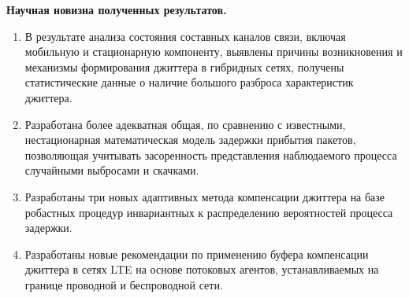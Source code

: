 \textbf{Научная новизна полученных результатов.} 
\begin{enumerate}
  \item В результате анализа состояния составных каналов связи, включая мобильную и стационарную компоненту, выявлены причины возникновения и механизмы формирования джиттера в гибридных сетях,
  получены статистические данные о наличие большого разброса характеристик джиттера.
  
 

  \item Разработана более адекватная общая, по сравнению с известными, нестационарная математическая модель задержки прибытия пакетов,
  позволяющая учитывать засоренность представления наблюдаемого процесса случайными выбросами и скачками.
  \item 
  Разработаны три новых адаптивных метода компенсации джиттера на базе робастных процедур инвариантных к распределению вероятностей процесса задержки.
  \item 
  Разработаны новые рекомендации по применению буфера компенсации джиттера в сетях LTE на основе потоковых агентов, устанавливаемых на границе проводной и беспроводной сети.
\end{enumerate}

